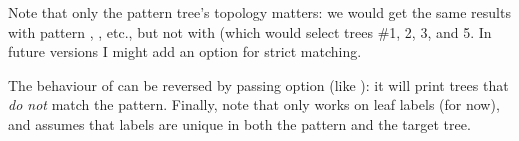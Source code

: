\page[no]


Note that only the pattern tree's topology matters: we would get the
same results with pattern ,
, etc., but not with
 (which would select trees \#1, 2, 3, and 5. In
future versions I might add an option for strict matching.

The behaviour of \match{} can be reversed by passing option  (like
): it will print trees that {\em do not} match the pattern.
Finally, note that \match{} only works on leaf labels (for now), and assumes
that labels are unique in both the pattern and the target tree.
